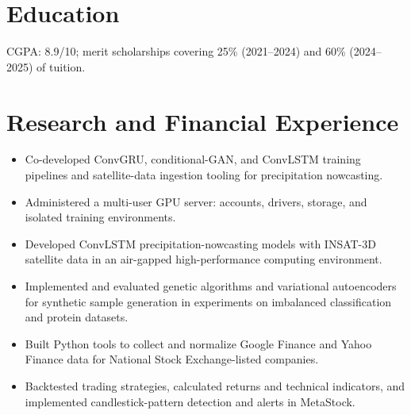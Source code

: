 
\titlespacing{\section}{0pt}{7pt}{3pt}

\resumeheader
\section{Education}
\vspace{3pt}
CGPA: 8.9/10; merit scholarships covering 25\% (2021--2024) and 60\% (2024--2025) of tuition.
\section{Research and Financial Experience}
\begin{itemize}
  \item Co-developed ConvGRU, conditional-GAN, and ConvLSTM training pipelines and satellite-data ingestion tooling for precipitation nowcasting.
  \item Administered a multi-user GPU server: accounts, drivers, storage, and isolated training environments.
\end{itemize}
\begin{itemize}
  \item Developed ConvLSTM precipitation-nowcasting models with INSAT-3D satellite data in an air-gapped high-performance computing environment.
\end{itemize}
\begin{itemize}
  \item Implemented and evaluated genetic algorithms and variational autoencoders for synthetic sample generation in experiments on imbalanced classification and protein datasets.
\end{itemize}
\begin{itemize}
  \item Built Python tools to collect and normalize Google Finance and Yahoo Finance data for National Stock Exchange-listed companies.
  \item Backtested trading strategies, calculated returns and technical indicators, and implemented candlestick-pattern detection and alerts in MetaStock.
\end{itemize}
